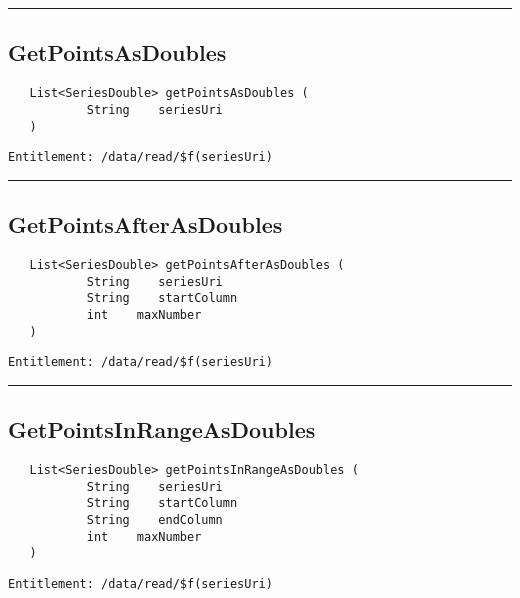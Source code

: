 \rule{12cm}{2pt}
\subsection{GetPointsAsDoubles}
\label{Api:GetPointsAsDoubles}
\begin{verbatim}
   List<SeriesDouble> getPointsAsDoubles (
           String    seriesUri
   )
\end{verbatim}
\begin{Verbatim}[fontsize=\small, formatcom=\color{Maroon}]
  Entitlement: /data/read/$f(seriesUri)
\end{Verbatim}



\rule{12cm}{2pt}
\subsection{GetPointsAfterAsDoubles}
\label{Api:GetPointsAfterAsDoubles}
\begin{verbatim}
   List<SeriesDouble> getPointsAfterAsDoubles (
           String    seriesUri
           String    startColumn
           int    maxNumber
   )
\end{verbatim}
\begin{Verbatim}[fontsize=\small, formatcom=\color{Maroon}]
  Entitlement: /data/read/$f(seriesUri)
\end{Verbatim}



\rule{12cm}{2pt}
\subsection{GetPointsInRangeAsDoubles}
\label{Api:GetPointsInRangeAsDoubles}
\begin{verbatim}
   List<SeriesDouble> getPointsInRangeAsDoubles (
           String    seriesUri
           String    startColumn
           String    endColumn
           int    maxNumber
   )
\end{verbatim}
\begin{Verbatim}[fontsize=\small, formatcom=\color{Maroon}]
  Entitlement: /data/read/$f(seriesUri)
\end{Verbatim}



